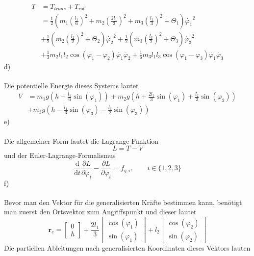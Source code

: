 \begin{align*}
	T &= T_{trans} + T_{rot} \\
	  &= \frac{1}{2}\left(m_1\left(\frac{l_1}{6}\right)^2 + m_2 \left(\frac{2l_1}{3}\right)^2 + m_3\left(\frac{l_1}{3}\right)^2 + \varTheta_1\right)\dot{\varphi_1}^2 \\
	  &+ \frac{1}{2}\left(m_2\left(\frac{l_2}{2}\right)^2 + \varTheta_2\right)\dot{\varphi_2}^2 + \frac{1}{2}\left(m_3\left(\frac{l_3}{2}\right)^2 + \varTheta_3\right)\dot{\varphi_3}^2 \\
	  &+ \frac{1}{3}m_2l_1l_2\cos(\varphi_1 - \varphi_2)\dot{\varphi_1}\dot{\varphi_2} + \frac{1}{6}m_3l_1l_3\cos(\varphi_1 - \varphi_3)\dot{\varphi_1}\dot{\varphi_3}
\end{align*}
d)\\ \\
Die potentielle Energie dieses Systems lautet
\begin{align*}
	V &= m_1g\left(h + \frac{l_1}{6}\sin(\varphi_1)\right) + m_2g\left(h + \frac{2l_1}{3}\sin(\varphi_1) + \frac{l_2}{2}\sin(\varphi_2)\right) \\
	&+ m_3g\left(h - \frac{l_1}{3}\sin(\varphi_3) - \frac{l_3}{2}\sin(\varphi_3)\right)
\end{align*}
e)\\ \\
Die allgemeiner Form lautet die Lagrange-Funktion
\[
	L = T - V
\]
und der Euler-Lagrange-Formalismus
\[
	\frac{\text{d}}{\text{d}t}\frac{\partial L}{\partial \dot{\varphi}_i} - \frac{\partial L}{\partial \varphi_i} = f_{q,i}, \qquad i \in \{1,2,3\}
\]
f)\\ \\
Bevor man den Vektor für die generalisierten Kräfte bestimmen kann, benötigt man zuerst den Ortsvektor zum Angriffspunkt und dieser lautet
\[
	\textbf{r}_e = \begin{bmatrix}
		0 \\
		h
	\end{bmatrix}
	+
	\frac{2l_1}{3}
	\begin{bmatrix}
		\cos(\varphi_1) \\
		\sin(\varphi_1)
	\end{bmatrix}
	+ l_2
	\begin{bmatrix}
		\cos(\varphi_2) \\
		\sin(\varphi_2)
	\end{bmatrix}
\]
Die partiellen Ableitungen nach generalisierten Koordinaten dieses Vektors lauten
